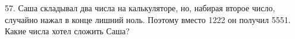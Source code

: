 57. Саша складывал два числа на калькуляторе, но, набирая второе число, случайно нажал в конце лишний ноль. Поэтому вместо 1222 он получил 5551. Какие числа хотел сложить Саша?\\
